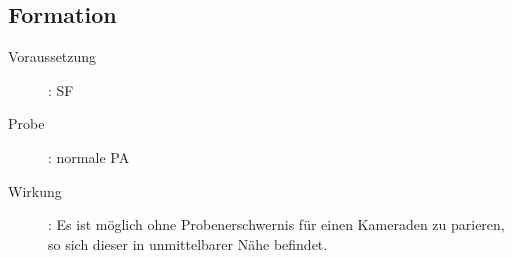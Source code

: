 \subsection{Formation}
\label{reaktion.formation}
\begin{description}
    \item[Voraussetzung]:
        SF 
    \item[Probe]:
        normale PA
    \item[Wirkung]:
        Es ist möglich ohne Probenerschwernis für einen Kameraden zu parieren, so sich dieser in unmittelbarer Nähe befindet.
\end{description}
